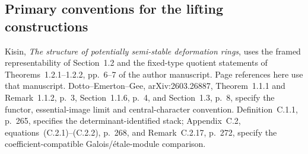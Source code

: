 \subsection{Primary conventions for the lifting constructions}
Kisin, \emph{The structure of potentially semi-stable deformation
rings}, uses the framed representability of Section~1.2 and the
fixed-type quotient statements of Theorems~1.2.1--1.2.2, pp.~6--7
of the author manuscript. Page references here use that manuscript.
Dotto--Emerton--Gee, arXiv:2603.26887, Theorem~1.1.1 and Remark~1.1.2,
p.~3, Section~1.1.6, p.~4, and Section~1.3, p.~8, specify the functor,
essential-image limit and central-character convention. Definition~C.1.1,
p.~265, specifies the determinant-identified stack; Appendix~C.2,
equations~(C.2.1)--(C.2.2), p.~268, and Remark~C.2.17, p.~272,
specify the coefficient-compatible Galois/\'{e}tale-module comparison.
